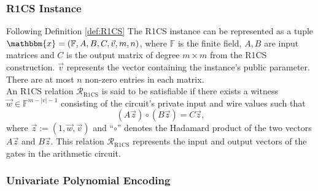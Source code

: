 \subsubsection{R1CS Instance}%
Following Definition \ref{def:R1CS} The R1CS instance can be represented as a tuple $\mathbbm{x} = (\mathbb{F},A,B,C,\vec{v},m,n)$, where $\mathbb{F}$ is the finite field, $A,B$ are input matrices and $C$ is the output matrix of degree $m \times m$ from the R1CS construction. $\vec{v}$ represents the vector containing the instance's public parameter. There are at most $n$ non-zero entries in each matrix. \\

An R1CS relation $\mathcal{R}_{\mathrm{R1CS}}$ is said to be satisfiable if there exists a witness $\vec{w} \in \mathbb{F}^{m - |v| - 1}$ consisting of the circuit's private input and wire values such that
\begin{equation*}
	(A\vec{z}) \circ (B\vec{z}) = C\vec{z},
\end{equation*}
where $\vec{z} := (1,\vec{w}, \vec{v})$ and “$\circ$” denotes the Hadamard product of the two vectors $A\vec{z}$ and $B\vec{z}$. This relation $\mathcal{R}_{\mathrm{R1CS}}$ represents the input and output vectors of the gates in the arithmetic circuit. \\



\subsubsection{Univariate Polynomial Encoding}\label{univariate_pol}

